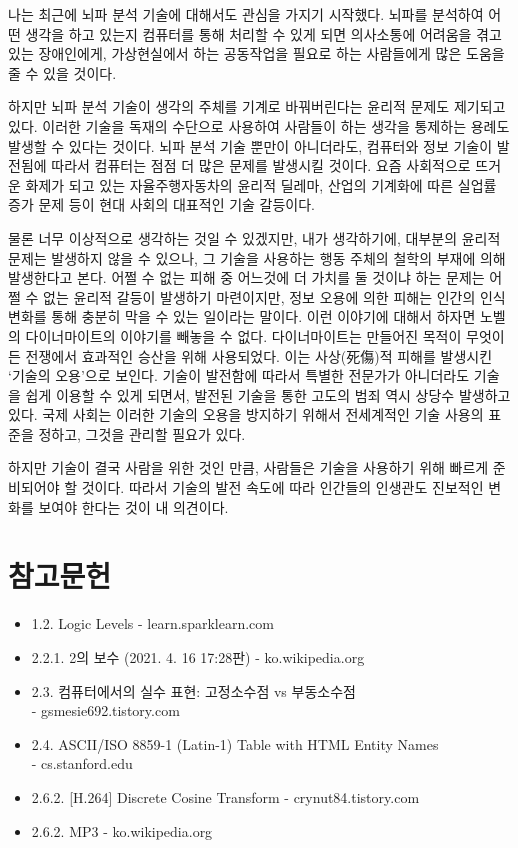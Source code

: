 \documentclass{article}
\begin{document}
나는 최근에 뇌파 분석 기술에 대해서도 관심을 가지기 시작했다.
뇌파를 분석하여 어떤 생각을 하고 있는지 컴퓨터를 통해 처리할 수 있게 되면
의사소통에 어려움을 겪고 있는 장애인에게, 가상현실에서 하는 공동작업을 필요로 하는 사람들에게
많은 도움을 줄 수 있을 것이다.

하지만 뇌파 분석 기술이 생각의 주체를 기계로 바꿔버린다는 윤리적 문제도 제기되고 있다.
이러한 기술을 독재의 수단으로 사용하여 사람들이 하는 생각을 통제하는 용례도 발생할 수 있다는 것이다.
뇌파 분석 기술 뿐만이 아니더라도, 컴퓨터와 정보 기술이 발전됨에 따라서 컴퓨터는 점점
더 많은 문제를 발생시킬 것이다.
요즘 사회적으로 뜨거운 화제가 되고 있는 자율주행자동차의 윤리적 딜레마,
산업의 기계화에 따른 실업률 증가 문제 등이 현대 사회의 대표적인 기술 갈등이다.

물론 너무 이상적으로 생각하는 것일 수 있겠지만, 내가 생각하기에, 대부분의 윤리적 문제는 발생하지
않을 수 있으나, 그 기술을 사용하는 행동 주체의 철학의 부재에 의해 발생한다고 본다.
어쩔 수 없는 피해 중 어느것에 더 가치를 둘 것이냐 하는 문제는 어쩔 수 없는 윤리적 갈등이 발생하기
마련이지만, 정보 오용에 의한 피해는 인간의 인식 변화를 통해 충분히 막을 수 있는 일이라는 말이다.
이런 이야기에 대해서 하자면 노벨의 다이너마이트의 이야기를 빼놓을 수 없다.
다이너마이트는 만들어진 목적이 무엇이든 전쟁에서 효과적인 승산을 위해 사용되었다.
이는 사상(死傷)적 피해를 발생시킨 `기술의 오용'으로 보인다.
기술이 발전함에 따라서 특별한 전문가가 아니더라도 기술을 쉽게 이용할 수 있게 되면서,
발전된 기술을 통한 고도의 범죄 역시 상당수 발생하고 있다.
국제 사회는 이러한 기술의 오용을 방지하기 위해서 전세계적인 기술 사용의 표준을 정하고,
그것을 관리할 필요가 있다.

하지만 기술이 결국 사람을 위한 것인 만큼, 사람들은 기술을 사용하기 위해 빠르게 준비되어야 할 것이다.
따라서 기술의 발전 속도에 따라 인간들의 인생관도 진보적인 변화를 보여야 한다는 것이 내 의견이다.

\section{참고문헌}

\begin{itemize}
    \item 1.2. Logic Levels - learn.sparklearn.com
    \item 2.2.1. 2의 보수 (2021. 4. 16 17:28판) - ko.wikipedia.org
    \item 2.3. 컴퓨터에서의 실수 표현: 고정소수점 vs 부동소수점 \\- gsmesie692.tistory.com
    \item 2.4. ASCII/ISO 8859-1 (Latin-1) Table with HTML Entity Names \\- cs.stanford.edu
    \item 2.6.2. [H.264] Discrete Cosine Transform - crynut84.tistory.com
    \item 2.6.2. MP3 - ko.wikipedia.org
\end{itemize}
\end{document}
